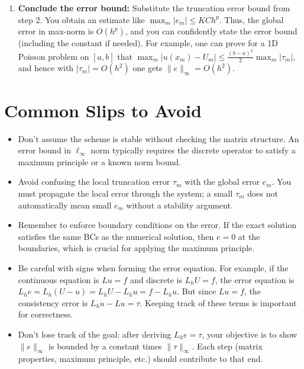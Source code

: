 \documentclass[a4paper,11pt]{report}
\begin{document}
\begin{enumerate}
    \item \textbf{Conclude the error bound:} Substitute the truncation error bound from step 2. You obtain an estimate like $\displaystyle \max_m |e_m| \leq KCh^p$. Thus, the global error in max-norm is $O(h^p)$, and you can confidently state the error bound (including the constant if needed). For example, one can prove for a 1D Poisson problem on $[a,b]$ that $\max_{m}|u(x_m)-U_m| \leq \frac{(b-a)^2}{2}\max_m|\tau_m|$, and hence with $|\tau_m|=O(h^2)$ one gets $\|e\|_\infty = O(h^2)$.
\end{enumerate}

\section{Common Slips to Avoid}

\begin{itemize}
    \item Don't assume the scheme is stable without checking the matrix structure. An error bound in $\ell_\infty$ norm typically requires the discrete operator to satisfy a maximum principle or a known norm bound.

    \item Avoid confusing the local truncation error $\tau_m$ with the global error $e_m$. You must propagate the local error through the system; a small $\tau_m$ does not automatically mean small $e_m$ without a stability argument.

    \item Remember to enforce boundary conditions on the error. If the exact solution satisfies the same BCs as the numerical solution, then $e=0$ at the boundaries, which is crucial for applying the maximum principle.

    \item Be careful with signs when forming the error equation. For example, if the continuous equation is $Lu=f$ and discrete is $L_h U = f$, the error equation is $L_h e = L_h(U - u) = L_h U - L_h u = f - L_h u$. But since $Lu=f$, the consistency error is $L_h u - Lu = \tau$. Keeping track of these terms is important for correctness.

    \item Don't lose track of the goal: after deriving $L_h e = \tau$, your objective is to show $\|e\|_\infty$ is bounded by a constant times $\|\tau\|_\infty$. Each step (matrix properties, maximum principle, etc.) should contribute to that end.
\end{itemize}
\end{document}
